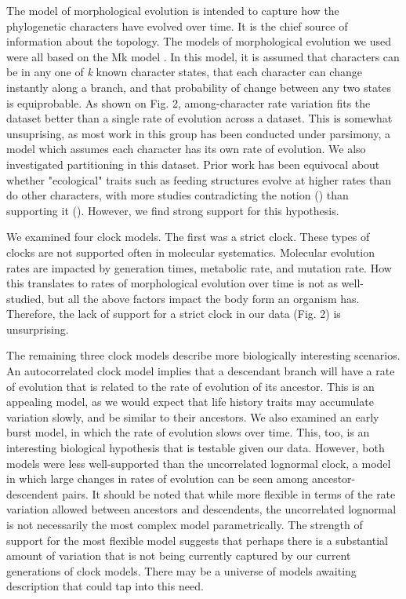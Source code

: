 \documentclass{article}
\begin{document}
The model of morphological evolution is intended to capture how the phylogenetic characters have evolved over time.
It is the chief source of information about the topology.
The models of morphological evolution we used were all based on the Mk model \citep{Lewis2001}. 
In this model, it is assumed that characters can be in any one of \textit{k} known character states, that each character can change instantly along a branch, and that probability of change between any two states is equiprobable.
As shown on Fig. 2, among-character rate variation fits the dataset better than a single rate of evolution across a dataset.
This is somewhat unsuprising, as most work in this group has been conducted under parsimony, a model which assumes each character has its own rate of evolution.
We also investigated partitioning in this dataset.
Prior work has been equivocal about whether "ecological" traits such as feeding structures evolve at higher rates than do other characters, with more studies contradicting the notion (\citep{Foote1994,Sánchez-Villagra1998,Ciampaglio2002}) than supporting it (\citep{Wagner1995,Blomberg2003}).
However, we find strong support for this hypothesis.

We examined four clock models.
The first was a strict clock. 
These types of clocks are not supported often in molecular systematics.
Molecular evolution rates are impacted by generation times,  metabolic rate, and mutation rate.
How this translates to rates of morphological evolution over time is not as well-studied, but all the above factors impact the body form an organism has.
Therefore, the lack of support for a strict clock in our data (Fig. 2) is unsurprising.

The remaining three clock models describe more biologically interesting scenarios.
An autocorrelated clock model implies that a descendant branch will have a rate of evolution that is related to the rate of evolution of its ancestor.
This is an appealing model, as we would expect that life history traits may accumulate variation slowly, and be similar to their ancestors. 
We also examined an early burst model, in which the rate of evolution slows over time.
This, too, is an interesting biological hypothesis that is testable given our data.
However, both models were less well-supported than the uncorrelated lognormal clock,
a model in which large changes in rates of evolution can be seen among ancestor-descendent pairs.
It should be noted that while more flexible in terms of the rate variation allowed between ancestors and descendents, the uncorrelated lognormal is not necessarily the most complex model parametrically. 
The strength of support for the most flexible model suggests that perhaps there is a substantial amount of variation that is not being currently captured by our current generations of clock models.
There may be a universe of models awaiting description that could tap into this need.
\end{document}
